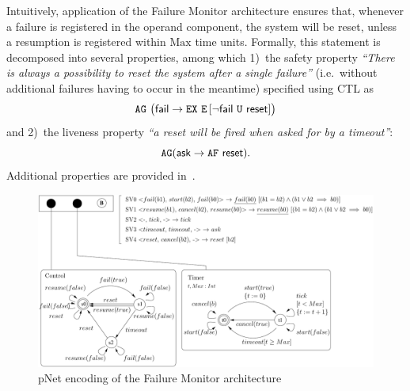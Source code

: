 \documentclass[smallcondensed]{svjour3}
\newcommand{\TODO}[1]{\textcolor{red}{\textbf{[TODO:#1]}}}
\newcommand{\AG}[1][\ ]{\ensuremath{\mathtt{AG}#1}}
\newcommand{\EX}[1][\ ]{\ensuremath{\mathtt{EX}#1}}
\newcommand{\EU}[3][\ ]{\ensuremath{\mathtt{E}\left[#2\ \mathtt{U}\ #3\right]#1}}
\newcommand{\ie}[1][\ ]{i.e.#1}
\begin{document}
%

Intuitively, application of the Failure Monitor architecture ensures
that, whenever a failure is registered in the operand component, the
system will be reset, unless a resumption is registered within
$\mathrm{Max}$ time units.  Formally, this statement is decomposed
into several properties, among which 
%
1)~the safety property \emph{``There is always a possibility to reset
  the system after a single failure''} (\ie without additional
failures having to occur in the meantime) specified using CTL as
%
\begin{equation}
  \label{eq:FM:safety}
  \AG
  \bigl(\PortFail \rightarrow
  \EX \EU[]{\lnot \PortFail}{\PortReset}\bigr)
\end{equation}
%
and 2)~the liveness property \emph{``a reset will be fired when asked
  for by a timeout''}:
%
\begin{equation}
  \label{eq:FM:liveness}
  \mathtt{AG}(\mathsf{ask} \rightarrow \mathtt{AF}\ \mathsf{reset}).
\end{equation}
%
Additional properties are provided in~\cite{Avocs-RR}.


\begin{figure}[t]
  \centering
  \includegraphics[width=0.9\columnwidth]{ActaXFIG/FailureTimerPNET-v2-2}
  \caption{pNet encoding of the Failure Monitor architecture}
  \label{schema:ArchFailure:pNet}
\end{figure}
\end{document}
